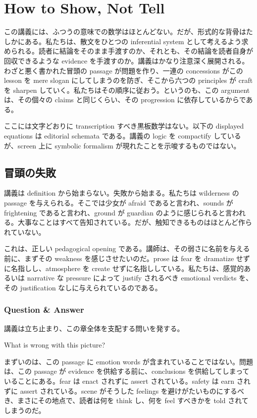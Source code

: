 \chapter{How to Show, Not Tell}

この講義には、ふつうの意味での数学はほとんどない。だが、形式的な背骨はたしかにある。私たちは、散文をひとつの inferential system として考えるよう求められる。読者に結論をそのまま手渡すのか、それとも、その結論を読者自身が回収できるような evidence を手渡すのか。講義はかなり注意深く展開される。わざと悪く書かれた冒頭の passage が問題を作り、一連の concessions がこの lesson を mere slogan にしてしまうのを防ぎ、そこから六つの principles が craft を sharpen していく。私たちはその順序に従おう。というのも、この argument は、その個々の claims と同じくらい、その progression に依存しているからである。

\begin{remark}
ここには文字どおりに transcription すべき黒板数学はない。以下の displayed equations は editorial schemata である。講義の logic を compactify しているが、screen 上に symbolic formalism が現れたことを示唆するものではない。
\end{remark}

\section{冒頭の失敗}

講義は definition から始まらない。失敗から始まる。私たちは wilderness の passage を与えられる。そこでは少女が afraid であると言われ、sounds が frightening であると言われ、ground が guardian のように感じられると言われる。大事なことはすべて告知されている。だが、触知できるものはほとんど作られていない。

これは、正しい pedagogical opening である。講師は、その弱さに名前を与える前に、まずその weakness を感じさせたいのだ。prose は fear を dramatize せずに名指しし、atmosphere を create せずに名指ししている。私たちは、感覚的あるいは narrative な pressure によって justify されるべき emotional verdicts を、その justification なしに与えられているのである。

\subsection{Question \& Answer}

講義は立ち止まり、この章全体を支配する問いを発する。

What is wrong with this picture?

まずいのは、この passage に emotion words が含まれていることではない。問題は、この passage が evidence を供給する前に、conclusions を供給してしまっていることにある。fear は enact されずに assert されている。safety は earn されずに assert されている。scene がそうした feelings を避けがたいものにするべき、まさにその地点で、読者は何を think し、何を feel すべきかを told されてしまうのだ。

